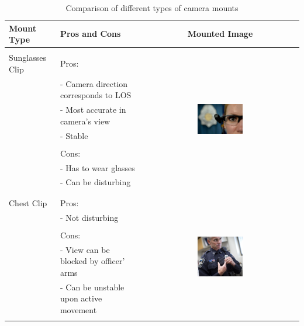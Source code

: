 \documentclass[12pt]{article}
\begin{document}
\begin{table}[h!]
    \centering
    \caption{Comparison of different types of camera mounts}
    \begin{tabular}{|l|l|c|}
        \hline
        \textbf{Mount Type} & \textbf{Pros and Cons} & \textbf{Mounted Image}\\
        \hline
        & & \\
        Sunglasses Clip & Pros: & \multirow{8}{*}{\includegraphics[width=0.3\textwidth]{glasses_mount}}\\
                        & - Camera direction corresponds to LOS & \\
                        & - Most accurate in camera's view & \\
                        & - Stable & \\
                        & & \\
                        & Cons: & \\
                        & - Has to wear glasses & \\
                        & - Can be disturbing & \\
        & & \\
        \hline
        & & \\
        Chest Clip & Pros: & \multirow{8}{*}{\includegraphics[width=0.3\textwidth]{chest_mount}}\\
                   & - Not disturbing & \\
                   & & \\
                   & Cons:  & \\
                   & - View can be blocked by officer' arms & \\
                   & - Can be unstable upon active movement  & \\
                   & & \\

\end{tabular}
\end{table}
\end{document}
